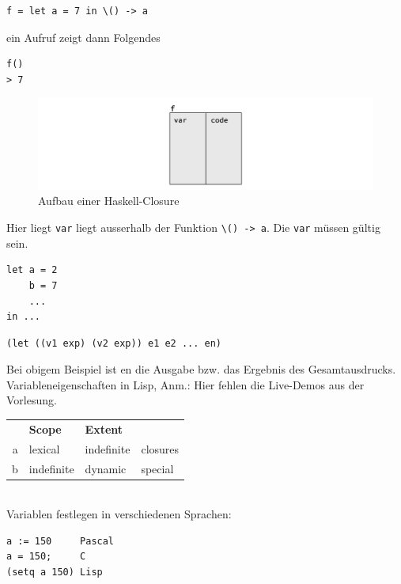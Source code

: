 		\lstHaskell
		\begin{lstlisting}
f = let a = 7 in \() -> a
		\end{lstlisting}

		ein Aufruf zeigt dann Folgendes

		\lstHaskell
		\begin{lstlisting}
f()
> 7
		\end{lstlisting}

		\begin{figure}[hb]
			\caption{Aufbau einer Haskell-Closure}
			\includegraphics[width=\textwidth]{workfiles/v11_1}
		\end{figure}
		Hier liegt \texttt{var} liegt ausserhalb der Funktion \texttt{\textbackslash() -> a}. Die \texttt{var} müssen gültig sein.

		\begin{lstlisting}
let a = 2
    b = 7
    ...
in ...
		\end{lstlisting}

		\begin{lstlisting}
(let ((v1 exp) (v2 exp)) e1 e2 ... en)
		\end{lstlisting}

		Bei obigem Beispiel ist en die Ausgabe bzw. das Ergebnis des Gesamtausdrucks.\\

		Variableneigenschaften in Lisp, Anm.: Hier fehlen die Live-Demos aus der Vorlesung.\\

		\begin{tabular}{rlll}
			& \textbf{Scope}	& \textbf{Extent} &  \\
		a	& lexical		& indefinite	& closures \\
		b	& indefinite	& dynamic		& special \\
		\end{tabular}$\;$\\

		Variablen festlegen in verschiedenen Sprachen:
		\begin{verbatim}
a := 150     Pascal
a = 150;     C
(setq a 150) Lisp
		\end{verbatim}

